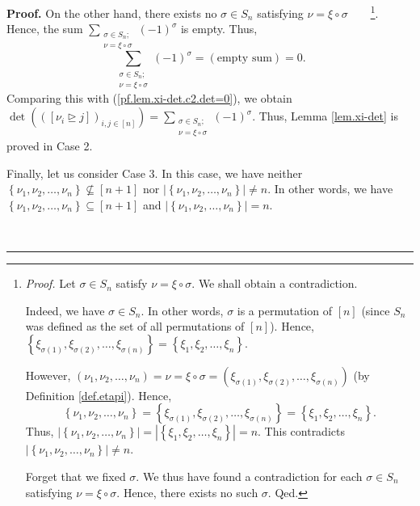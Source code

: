 \documentclass
[numbers=enddot,12pt,final,onecolumn,notitlepage,english]{scrartcl}%
\theoremstyle{definition}
\newenvironment{proof}[1][Proof]{\noindent\textbf{#1.} }{\ \rule{0.5em}{0.5em}}
\let\sumnonlimits\sum
\renewcommand{\sum}{\sumnonlimits\limits}
\newenvironment{verlong}{}{}
\begin{document}
\begin{proof}
\begin{verlong}
On the other hand, there exists no $\sigma\in S_{n}$ satisfying $\nu=\xi
\circ\sigma$\ \ \ \ \footnote{\textit{Proof.} Let $\sigma\in S_{n}$ satisfy
$\nu=\xi\circ\sigma$. We shall obtain a contradiction.
\par
Indeed, we have $\sigma\in S_{n}$. In other words, $\sigma$ is a permutation
of $\left[  n\right]  $ (since $S_{n}$ was defined as the set of all
permutations of $\left[  n\right]  $). Hence, $\left\{  \xi_{\sigma\left(
1\right)  },\xi_{\sigma\left(  2\right)  },\ldots,\xi_{\sigma\left(  n\right)
}\right\}  =\left\{  \xi_{1},\xi_{2},\ldots,\xi_{n}\right\}  $.
\par
However, $\left(  \nu_{1},\nu_{2},\ldots,\nu_{n}\right)  =\nu=\xi\circ
\sigma=\left(  \xi_{\sigma\left(  1\right)  },\xi_{\sigma\left(  2\right)
},\ldots,\xi_{\sigma\left(  n\right)  }\right)  $ (by Definition
\ref{def.etapi}). Hence,
\[
\left\{  \nu_{1},\nu_{2},\ldots,\nu_{n}\right\}  =\left\{  \xi_{\sigma\left(
1\right)  },\xi_{\sigma\left(  2\right)  },\ldots,\xi_{\sigma\left(  n\right)
}\right\}  =\left\{  \xi_{1},\xi_{2},\ldots,\xi_{n}\right\}  .
\]
Thus, $\left\vert \left\{  \nu_{1},\nu_{2},\ldots,\nu_{n}\right\}  \right\vert
=\left\vert \left\{  \xi_{1},\xi_{2},\ldots,\xi_{n}\right\}  \right\vert =n$.
This contradicts $\left\vert \left\{  \nu_{1},\nu_{2},\ldots,\nu_{n}\right\}
\right\vert \neq n$.
\par
Forget that we fixed $\sigma$. We thus have found a contradiction for each
$\sigma\in S_{n}$ satisfying $\nu=\xi\circ\sigma$. Hence, there exists no such
$\sigma$. Qed.}. Hence, the sum $\sum_{\substack{\sigma\in S_{n};\\\nu
=\xi\circ\sigma}}\left(  -1\right)  ^{\sigma}$ is empty. Thus,%
\[
\sum_{\substack{\sigma\in S_{n};\\\nu=\xi\circ\sigma}}\left(  -1\right)
^{\sigma}=\left(  \text{empty sum}\right)  =0.
\]
Comparing this with (\ref{pf.lem.xi-det.c2.det=0}), we obtain $\det\left(
\left(  \left[  \nu_{i}\trianglerighteq j\right]  \right)  _{i,j\in\left[
n\right]  }\right)  =\sum_{\substack{\sigma\in S_{n};\\\nu=\xi\circ\sigma
}}\left(  -1\right)  ^{\sigma}$. Thus, Lemma \ref{lem.xi-det} is proved in
Case 2. \medskip
\end{verlong}

Finally, let us consider Case 3. In this case, we have neither $\left\{
\nu_{1},\nu_{2},\ldots,\nu_{n}\right\}  \not \subseteq \left[  n+1\right]  $
nor $\left\vert \left\{  \nu_{1},\nu_{2},\ldots,\nu_{n}\right\}  \right\vert
\neq n$. In other words, we have $\left\{  \nu_{1},\nu_{2},\ldots,\nu
_{n}\right\}  \subseteq\left[  n+1\right]  $ and $\left\vert \left\{  \nu
_{1},\nu_{2},\ldots,\nu_{n}\right\}  \right\vert =n$.


\end{proof}
\end{document}
